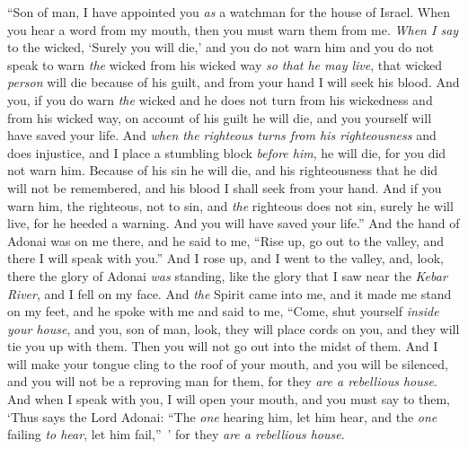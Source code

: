 \begin{biblechapter}
\verse “Son of man, I have appointed you \textit{as} a watchman for the house of Israel. When you hear a word from my mouth, then you must warn them from me.
\verse \textit{When I say} to the wicked, ‘Surely you will die,’ and you do not warn him and you do not speak to warn \textit{the} wicked from his wicked way \textit{so that he may live}, that wicked \textit{person} will die because of his guilt, and from your hand I will seek his blood.
\verse And you, if you do warn \textit{the} wicked and he does not turn from his wickedness and from his wicked way, on account of his guilt he will die, and you yourself will have saved your life.
\verse And \textit{when the righteous turns from his righteousness} and does injustice, and I place a stumbling block \textit{before him}, he will die, for you did not warn him. Because of his sin he will die, and his righteousness that he did will not be remembered, and his blood I shall seek from your hand.
\verse And if you warn him, the righteous, not to sin, and \textit{the} righteous does not sin, surely he will live, for he heeded a warning. And you will have saved your life.”
\verse And the hand of Adonai was on me there, and he said to me, “Rise up, go out to the valley, and there I will speak with you.”
\verse And I rose up, and I went to the valley, and, look, there the glory of Adonai \textit{was} standing, like the glory that I saw near the \textit{Kebar River}, and I fell on my face.
\verse And \textit{the} Spirit came into me, and it made me stand on my feet, and he spoke with me and said to me, “Come, shut yourself \textit{inside your house},
\verse and you, son of man, look, they will place cords on you, and they will tie you up with them. Then you will not go out into the midst of them.
\verse And I will make your tongue cling to the roof of your mouth, and you will be silenced, and you will not be a reproving man for them, for they \textit{are a rebellious house}.
\verse And when I speak with you, I will open your mouth, and you must say to them, ‘Thus says the Lord Adonai: “The \textit{one} hearing him, let him hear, and the \textit{one} failing \textit{to hear}, let him fail,” ’ for they \textit{are a rebellious house}.
\end{biblechapter}

